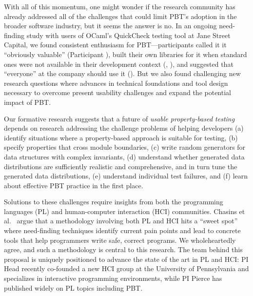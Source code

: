 With all of this momentum, one might wonder if the research community has
already
addressed all of the challenges that could limit PBT's adoption
in the broader software industry, but it
seems the answer is no.
In an ongoing need-finding study with users of OCaml's QuickCheck testing tool
at Jane Street Capital, we found
consistent enthusiasm for PBT---participants called it it
``obviously valuable'' (Participant ),
built their own libraries for it when standard ones were not available in their
development context (,
), and suggested that ``everyone'' at the company should use it
(). But we also found
challenging new research questions where advances in technical foundations and
tool design necessary to overcome present usability challenges and expand the
potential impact of PBT.

Our formative research suggests that a future of \emph{usable property-based
testing} depends on research addressing the challenge problems of helping
developers
%
(a) identify situations where a property-based approach is suitable for
testing,
%
(b) specify properties that cross module boundaries,
%
(c) write random generators for data structures with complex invariants,
%
(d) understand whether generated data distributions are sufficiently realistic
and comprehensive, and in turn tune the generated data distributions,
%
(e) understand individual test failures, and
%
(f) learn about effective PBT practice in the first place.
\iflater{}\fi

Solutions to these challenges require insights from both the
programming languages (PL) and
human-computer interaction (HCI) communities.  Chasins et
al.~\cite{chasins_pl_2021} argue that a methodology
involving
both PL and HCI hits a ``sweet spot'' where need-finding techniques identify
current pain points and lead to concrete tools that help programmers write
safe, correct programs. We wholeheartedly agree, and such a methodology is
central to this research.
The team behind this proposal is uniquely positioned to advance the
state of the art in PL and HCI: PI Head recently co-founded
a new HCI group at the University of Pennsylvania and specializes in interactive
programming environments, while PI Pierce has
published widely on PL topics including PBT.

